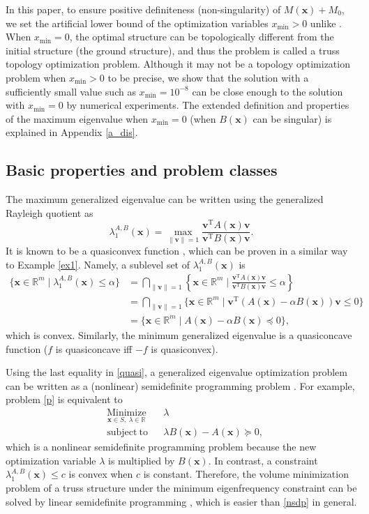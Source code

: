 \documentclass[sn-mathphys,Numbered]{sn-jnl}%
\theoremstyle{thmstyleone}%
\theoremstyle{thmstyletwo}%
\theoremstyle{thmstylethree}%
\newcommand{\e}[1]{\begin{equation}#1\end{equation}}
\newcommand{\cur}[1]{\left\{#1\right\}}
\def\rm{\mathbb{R}^m}
\def\tp{\mathrm{T}}
\def\lamx{\lambda^{A,B}_1(\boldsymbol{x})}
\begin{document}
In this paper, to ensure positive definiteness (non-singularity) of $M(\bm{x})+M_0$, we set the artificial lower bound of the optimization variables $x_{\mathrm{min}}>0$ unlike \cite{achtziger07siam}. When $x_{\mathrm{min}}=0$, the optimal structure can be topologically different from the initial structure (the ground structure), and thus the problem is called a truss topology optimization problem. Although it may not be a topology optimization problem when $x_{\mathrm{min}}>0$ to be precise, we show that the solution with a sufficiently small value such as $x_{\mathrm{min}}=10^{-8}$ can be close enough to the solution with $x_{\mathrm{min}}=0$ by numerical experiments. The extended definition and properties of the maximum eigenvalue when $x_{\mathrm{min}}=0$ (when $B(\bm{x})$ can be singular) is explained in Appendix \ref{a_dis}.

\subsection{Basic properties and problem classes}

The maximum generalized eigenvalue can be written using the generalized Rayleigh quotient \cite{boyd93} as
\e{
\lamx = \underset{\|\bm{v}\|=1}{\max}\frac{\bm{v}^\tp A(\bm{x})\bm{v}}{\bm{v}^\tp B(\bm{x})\bm{v}}.
}
It is known to be a quasiconvex function \cite{achtziger07siam}, which can be proven in a similar way to Example \ref{ex1}. Namely, a sublevel set of $\lamx$ is
\begin{align}
\{\bm{x}\in\rm \mid \lamx\le \alpha\}
& = \underset{\|\bm{v}\|=1}{\bigcap}\cur{\bm{x}\in\rm \mid \frac{\bm{v}^\tp A(\bm{x}) \bm{v}}{\bm{v}^\tp B(\bm{x}) \bm{v}} \le \alpha}\\
& = \underset{\|\bm{v}\|=1}{\bigcap}\{\bm{x}\in\rm \mid \bm{v}^\tp(A(\bm{x})-\alpha B(\bm{x}))\bm{v} \le 0\}\\
& = \{\bm{x}\in\rm \mid A(\bm{x})-\alpha B(\bm{x}) \preceq 0\},
\label{quasi}
\end{align}
which is convex. Similarly, the minimum generalized eigenvalue is a quasiconcave function ($f$ is quasiconcave iff $-f$ is quasiconvex).

Using the last equality in \eqref{quasi}, a generalized eigenvalue optimization problem can be written as a (nonlinear) semidefinite programming problem \cite{achtziger07siam}. For example, problem \eqref{p} is equivalent to
\e{
\begin{aligned}
& \underset{\bm{x}\in S,\ \lambda\in \mathbb{R}}{\mathrm{Minimize}} & & \lambda\\
& \mathrm{subject\ to} & & \lambda B(\bm{x})-A(\bm{x})\succeq 0,
\label{nsdp}
\end{aligned}
}
which is a nonlinear semidefinite programming problem because the new optimization variable $\lambda$ is multiplied by $B(\bm{x})$. In contrast, a constraint $\lamx \le c$ is convex when $c$ is constant. Therefore, the volume minimization problem of a truss structure under the minimum eigenfrequency constraint can be solved by linear semidefinite programming \cite{ohsaki99}, which is easier than \eqref{nsdp} in general.
\end{document}
